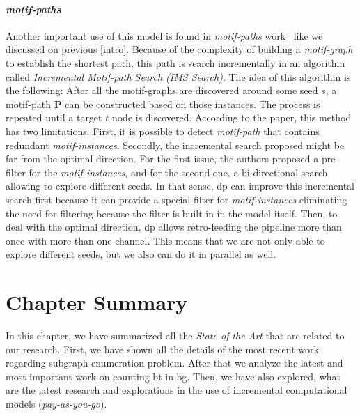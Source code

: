 \paragraph{\emph{motif-paths}} Another important use of this model is found in \emph{motif-paths} work~\cite{Li2019MotifPA} like we discussed on previous \autoref{intro}.
Because of the complexity of building a \emph{motif-graph} to establish the shortest path, this path is search incrementally in an algorithm called \emph{Incremental Motif-path Search (IMS Search)}.
The idea of this algorithm is the following: After all the motif-graphs are discovered around some seed $s$, a motif-path $\mathbf{P}$ can be constructed based on those instances.
The process is repeated until a target $t$ node is discovered. According to the paper, this method has two limitations. First, it is possible to detect \emph{motif-path} that contains 
redundant \emph{motif-instances}. Secondly, the incremental search proposed might be far from the optimal direction. For the first issue, the authors proposed a pre-filter for the \emph{motif-instances},
and for the second one, a bi-directional search allowing to explore different seeds. 
In that sense, \acrshort{dp} can improve this incremental search first because it can provide a special filter for \emph{motif-instances} eliminating the need for filtering because the filter is built-in in the model itself.
Then, to deal with the optimal direction, \acrshort{dp} allows retro-feeding the pipeline more than once with more than one channel. This means that we are not only able to explore different seeds, but we also can do it in parallel as well.

\section{Chapter Summary}
In this chapter, we have summarized all the \emph{State of the Art} that are related to our research.
First, we have shown all the details of the most recent work regarding subgraph enumeration problem. 
After that we analyze the latest and most important work on counting \acrlong{bt} in \acrlong{bg}.
Then, we have also explored, what are the latest research and explorations in the use of incremental computational models (\emph{pay-as-you-go}).
